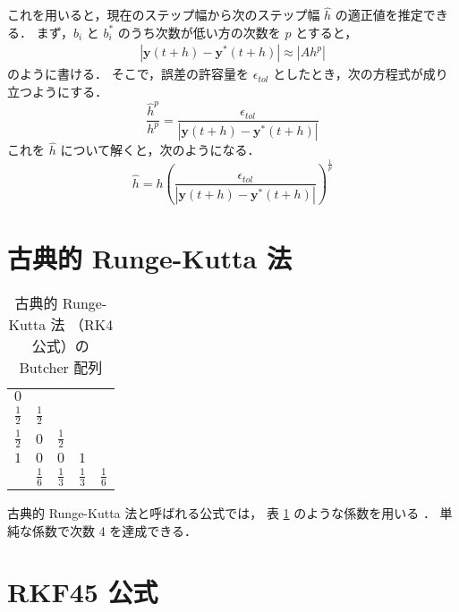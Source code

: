 これを用いると，現在のステップ幅から次のステップ幅 $\hat{h}$ の適正値を推定できる．
まず，$b_i$ と $b_i^*$ のうち次数が低い方の次数を $p$ とすると，
\begin{align}
    \left| \bm{y}(t + h) - \bm{y}^*(t + h) \right| \approx |Ah^p|
\end{align}
のように書ける．
そこで，誤差の許容量を $\epsilon_{tol}$ としたとき，次の方程式が成り立つようにする．
\begin{equation}
    \frac{\hat{h}^p}{h^p} = \frac{\epsilon_{tol}}{\left| \bm{y}(t + h) - \bm{y}^*(t + h) \right|}
\end{equation}
これを $\hat{h}$ について解くと，次のようになる．
\begin{equation}
    \hat{h} = h \left(\frac{\epsilon_{tol}}{\left| \bm{y}(t + h) - \bm{y}^*(t + h) \right|}\right)^{\frac{1}{p}}
\end{equation}

\section{古典的 Runge-Kutta 法}

\begin{table}[tb]
    \caption{古典的 Runge-Kutta 法 （RK4 公式）の Butcher 配列}
    \label{table:ode_runge-kutta_butcher-array-rk4}
    \centering
    \begin{tabular}{c|cccc}
        $0$           &               &               &               &               \\
        $\frac{1}{2}$ & $\frac{1}{2}$ &               &               &               \\
        $\frac{1}{2}$ & $0$           & $\frac{1}{2}$ &               &               \\
        $1$           & $0$           & $0$           & $1$           &               \\
        \hline
                      & $\frac{1}{6}$ & $\frac{1}{3}$ & $\frac{1}{3}$ & $\frac{1}{6}$
    \end{tabular}
\end{table}

古典的 Runge-Kutta 法と呼ばれる公式では，
表 \ref{table:ode_runge-kutta_butcher-array-rk4} のような係数を用いる
\cite[3.3 節]{Mitsui1993}．
単純な係数で次数 4 を達成できる．

\section{RKF45 公式}

